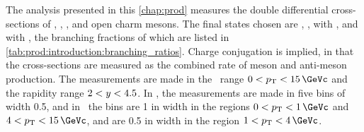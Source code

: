 The analysis presented in this \cref{chap:prod} measures the double 
differential cross-sections of \PDzero, \PDp, \PDsplus, and \PDstarp open charm 
mesons.\footnotemark
The final states chosen are \DzToKpi, \DpToKpipi, \DspTophipi with \phiToKK, 
and \DstToDzpi with \DzToKpi, the branching fractions of which are listed in 
\cref{tab:prod:introduction:branching_ratios}.
Charge conjugation is implied, in that the cross-sections are measured as the 
combined rate of meson and anti-meson production.
The measurements are made in the \pT\ range $0 < \pT < \SI{15}{\GeVc}$ and the 
rapidity range $2 < y < 4.5$.
In \rapidity, the measurements are made in five bins of width 0.5, and in \pT\ 
the bins are \SI{1}{\GeVc} in width in the regions $0 < \pT < \SI{1}{\GeVc}$ 
and $4 < \pT < \SI{15}{\GeVc}$, and are \SI{0.5}{\GeVc} in width in the region 
$1 < \pT < \SI{4}{\GeVc}$.


\begin{table}
  \centering
  \caption{%
      Branching ratios for the different decay 
      modes~\cite{PDG2014,Alexander:2008aa}.
      The \DspTophipi\ branching fraction includes the branching fraction of 
      \phiToKK\@.
  }
  \label{tab:prod:introduction:branching_ratios}
  
\end{table}

